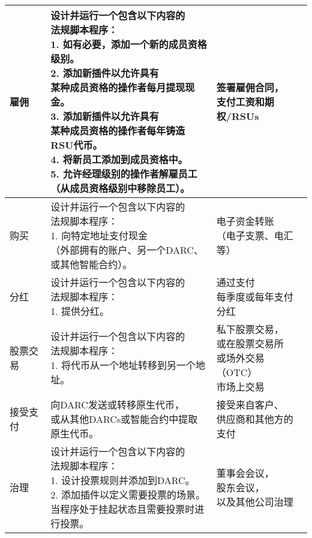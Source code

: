 \documentclass[main.tex]{subfiles}
\begin{document}
\begin{table}[h!]
\begin{tabular}{| l | l| l|}
    \hline
    雇佣 & \makecell[l]{设计并运行一个包含以下内容的\\ 法规脚本程序：\\ 1. 如有必要，添加一个新的成员资格级别。\\ 2. 添加新插件以允许具有\\ 某种成员资格的操作者每月提现现金。 \\ 3. 添加新插件以允许具有\\ 某种成员资格的操作者每年铸造RSU代币。 \\ 4. 将新员工添加到成员资格中。 \\ 5. 允许经理级别的操作者解雇员工\\（从成员资格级别中移除员工）。} & \makecell[l]{签署雇佣合同，\\ 支付工资和期权/RSUs} \\
    \hline
    购买 & \makecell[l]{设计并运行一个包含以下内容的\\ 法规脚本程序：\\ 1. 向特定地址支付现金\\（外部拥有的账户、另一个DARC、\\ 或其他智能合约）。}  & \makecell[l]{电子资金转账\\（电子支票、电汇等）} \\
    \hline
    分红 & \makecell[l]{设计并运行一个包含以下内容的\\ 法规脚本程序：\\ 1. 提供分红。} & \makecell[l]{通过支付\\ 每季度或每年支付分红} \\
    \hline 
    股票交易 & \makecell[l]{设计并运行一个包含以下内容的\\ 法规脚本程序：\\ 1. 将代币从一个地址转移到另一个地址。} & \makecell[l]{私下股票交易，\\ 或在股票交易所\\ 或场外交易（OTC）\\ 市场上交易} \\
    \hline
    接受支付 & \makecell[l]{向DARC发送或转移原生代币，\\ 或从其他DARCs或智能合约中提取原生代币。} & \makecell[l]{接受来自客户、\\ 供应商和其他方的支付} \\
    \hline 
    治理 & \makecell[l]{设计并运行一个包含以下内容的\\ 法规脚本程序：\\ 1. 设计投票规则并添加到DARC。 \\ 2. 添加插件以定义需要投票的场景。 \\ 当程序处于挂起状态且需要投票时进行投票。} & \makecell[l]{董事会会议，\\ 股东会议，\\ 以及其他公司治理} \\

\end{tabular}
\end{table}
\end{document}
